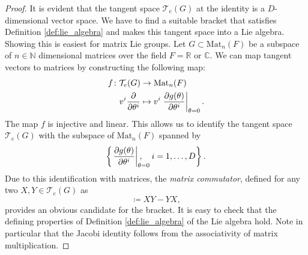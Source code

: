 \begin{proof}
  It is evident that the tangent space $\mathcal{T}_e(G)$ at the identity is a $D$-dimensional vector space. 
  We have to find a suitable bracket that satisfies Definition \ref{def:lie_algebra} and makes this tangent space into a Lie algebra.
  Showing this is easiest for matrix Lie groups.
  Let $G \subset \text{Mat}_n (F)$ be a subspace of $n \in \mathbb{N}$ dimensional matrices over the field $F = \mathbb{R}$ or $\mathbb{C}$.
  We can map tangent vectors to matrices by constructing the following map:
  \begin{equation}
    \begin{split}
      f \colon \mathcal{T}_e(G) &\to \text{Mat}_n(F) \\
      v^i \pdv{}{\theta^i} &\mapsto v^i \left.\pdv{g(\theta)}{\theta^i} \right\lvert_{\theta = 0}.
    \end{split}
  \end{equation}
  The map $f$ is injective and linear.
  This allows us to identify the tangent space $\mathcal{T}_e(G)$ with the subspace of $\text{Mat}_n(F)$ spanned by
  \begin{equation}
    \left\{ \left. \pdv{g(\theta)}{\theta^i}\right\rvert_{\mathrlap{\theta = 0}}, \quad i = 1, \ldots, D \right\}.
  \end{equation}
  Due to this identification with matrices, the \emph{matrix commutator}, defined for any two $X, Y \in \mathcal{T}_e (G)$ as
  \begin{equation}
    [X, Y] \coloneqq XY - YX,
  \end{equation}
  provides an obvious candidate for the bracket.
  It is easy to check that the defining properties of Definition \ref{def:lie_algebra} of the Lie algebra hold.
  Note in particular that the Jacobi identity follows from the associativity of matrix multiplication.
  

\end{proof}
